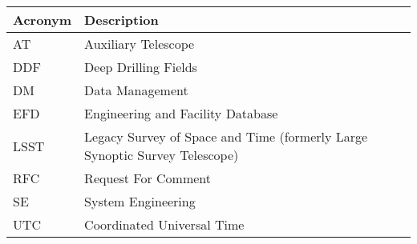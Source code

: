 \addtocounter{table}{-1}
\begin{longtable}{p{}p{}}\hline
\textbf{Acronym} & \textbf{Description}  \\\hline

AT & Auxiliary Telescope \\\hline
DDF & Deep Drilling Fields \\\hline
DM & Data Management \\\hline
EFD & Engineering and Facility Database \\\hline
LSST & Legacy Survey of Space and Time (formerly Large Synoptic Survey Telescope) \\\hline
RFC & Request For Comment \\\hline
SE & System Engineering \\\hline
UTC & Coordinated Universal Time \\\hline
\end{longtable}

